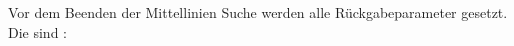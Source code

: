 Vor dem Beenden der Mittellinien Suche werden alle R{\"u}ckgabeparameter gesetzt. Die sind :

















